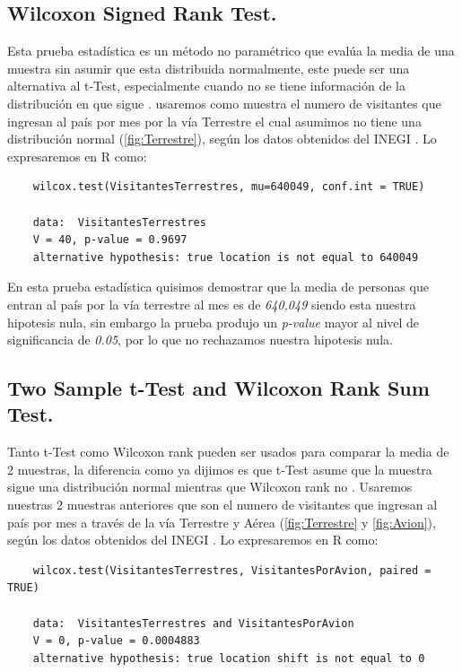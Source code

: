 \documentclass[]{article}
\begin{document}
\subsection{Wilcoxon Signed Rank Test.}
Esta prueba estadística es un método no paramétrico que evalúa la media de una muestra sin asumir que esta distribuida normalmente, este puede ser una alternativa al t-Test, especialmente cuando no se tiene información de la distribución en que sigue \cite{Articulo_0}.
usaremos como muestra el numero de visitantes que ingresan al país por mes por la vía Terrestre el cual asumimos no tiene una distribución normal (\autoref{fig:Terrestre}), según los datos obtenidos del INEGI \cite{inegi}.
Lo expresaremos en R como:
  \begin{lstlisting}
	wilcox.test(VisitantesTerrestres, mu=640049, conf.int = TRUE)
	
	data:  VisitantesTerrestres
	V = 40, p-value = 0.9697
	alternative hypothesis: true location is not equal to 640049
   \end{lstlisting}
   
 En esta prueba estadística quisimos demostrar que la media de personas que entran al país por la vía terrestre al mes es de \textit{640,049} siendo esta nuestra hipotesis nula, sin embargo la prueba produjo un \textit{p-value} mayor al nivel de significancia de \textit{0.05}, por lo que no rechazamos nuestra hipotesis nula.


\subsection{Two Sample t-Test and Wilcoxon Rank Sum Test.}
Tanto t-Test como Wilcoxon rank pueden ser usados para comparar la media de 2 muestras, la diferencia como ya dijimos es que t-Test asume que la muestra sigue una distribución normal mientras que Wilcoxon rank no \cite{Articulo_0}.
Usaremos nuestras 2 muestras anteriores que son el numero de visitantes que ingresan al país por mes a través de la vía Terrestre y Aérea (\autoref{fig:Terrestre} y \autoref{fig:Avion}), según los datos obtenidos del INEGI \cite{inegi}.
Lo expresaremos en R como:
  \begin{lstlisting}
	wilcox.test(VisitantesTerrestres, VisitantesPorAvion, paired = TRUE)
	
	data:  VisitantesTerrestres and VisitantesPorAvion
	V = 0, p-value = 0.0004883
	alternative hypothesis: true location shift is not equal to 0


   \end{lstlisting}
   
\end{document}

